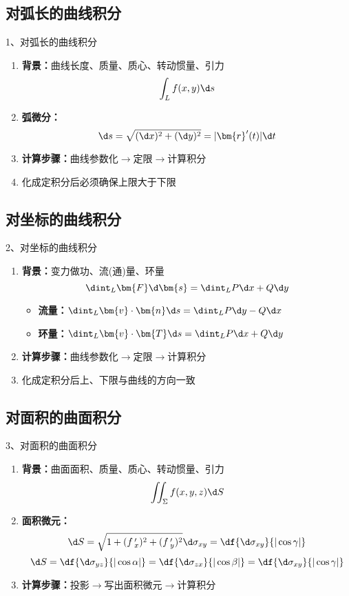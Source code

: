 \subsection{对弧长的曲线积分}

\begin{frame}[<+->]{1、对弧长的曲线积分}
	\linespread{1.2}
	\begin{enumerate}
	  \item {\bf 背景：}曲线长度、质量、质心、转动惯量、引力
	 	$$\int_{L}f(x,y)\d s$$
	  \item {\bf 弧微分：}
		$$\d s=\sqrt{(\d x)^2+(\d y)^2}=|\bm{r}'(t)|\d t$$
	  \item {\bf 计算步骤：}曲线参数化$\to$定限$\to$计算积分
	  \item {}\alert{化成定积分后必须确保上限大于下限}
	\end{enumerate}
\end{frame}

\subsection{对坐标的曲线积分}

\begin{frame}[<+->]{2、对坐标的曲线积分}
	\linespread{1.2}
	\begin{enumerate}
	  \item {\bf 背景：}变力做功、流(通)量、环量
	  	$$\dint_L\bm{F}\d\bm{s}=\dint_L P\d x+Q\d y$$
	  \begin{itemize}
	    \item {\bf 流量：}$\dint_L\bm{v}\cdot\bm{n}\d s=\dint_LP\d y-Q\d x$
	    \item {\bf 环量：}$\dint_L\bm{v}\cdot\bm{T}\d s=\dint_LP\d x+Q\d y$
	  \end{itemize}
	  \item {\bf 计算步骤：}曲线参数化$\to$定限$\to$计算积分
	  \item {}\alert{化成定积分后上、下限与曲线的方向一致}
	\end{enumerate}
\end{frame}

\subsection{对面积的曲面积分}

\begin{frame}[<+->]{3、对面积的曲面积分}
	\linespread{1.2}
	\begin{enumerate}
	  \item {\bf 背景：}曲面面积、质量、质心、转动惯量、引力
	 	$$\iint_{\Sigma}f(x,y,z)\d S$$
	  \item {\bf 面积微元：}
		$$\d
		S=\sqrt{1+(f\,'_x)^2+(f\,'_y)^2}\d\sigma_{xy}=\df{\d\sigma_{xy}}{|\cos\gamma|}$$
		$$\d S=\df{\d\sigma_{yz}}{|\cos\alpha|}=
		\df{\d\sigma_{zx}}{|\cos\beta|}
		=\df{\d\sigma_{xy}}{|\cos\gamma|}$$
	  \item {\bf 计算步骤：}投影$\to$写出面积微元$\to$计算积分
	\end{enumerate}
\end{frame}

